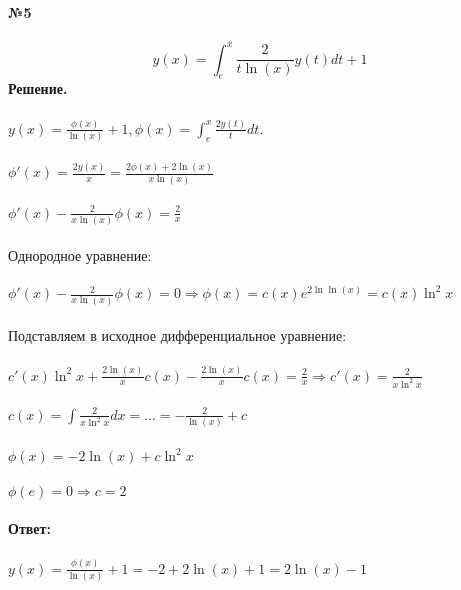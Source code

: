 \documentclass[10pt,a4paper]{article}
\begin{document}
	\noindent\textbf{№5} \\  \\
	$$y(x) = \int_{e}^{x}\frac{2}{t\ln(x)}y(t)dt + 1$$
	\textbf{Решение.} \\ \\
	$y(x) = \frac{\phi(x)}{\ln(x)} + 1, \phi(x) = \int_{e}^{x}\frac{2y(t)}{t}dt.$ \\  \\
	$\phi'(x) = \frac{2y(x)}{x} = \frac{2\phi(x) + 2\ln(x)}{x\ln(x)}$ \\ \\
	$\phi'(x) - \frac{2}{x\ln(x)}\phi(x) = \frac{2}{x}$ \\ \\ 
	Однородное уравнение: \\ \\
	$\phi'(x) - \frac{2}{x\ln(x)}\phi(x) = 0 \Rightarrow \phi(x) = c(x)e^{2\ln\ln(x)} = c(x)\ln^2x$ \\ \\ 
	Подставляем в исходное дифференциальное уравнение: \\ \\
	$c'(x)\ln^2x + \frac{2\ln(x)}{x}c(x) - \frac{2\ln(x)}{x}c(x) = \frac{2}{x} \Rightarrow c'(x) = \frac{2}{x\ln^2 x}$ \\ \\
	$c(x) = \int\frac{2}{x\ln^2 x}dx = \dots = -\frac{2}{\ln(x)} + c$ \\ \\
	$\phi(x) = -2\ln(x) + c\ln^2 x$ \\ \\
	$\phi(e) = 0 \Rightarrow c = 2$ \\ \\
	\textbf{Ответ:} \\ \\
	$y(x) =  \frac{\phi(x)}{\ln(x)} + 1 = -2 + 2\ln(x) + 1 = 2\ln(x) - 1$ \\ \\		
	
\end{document}
